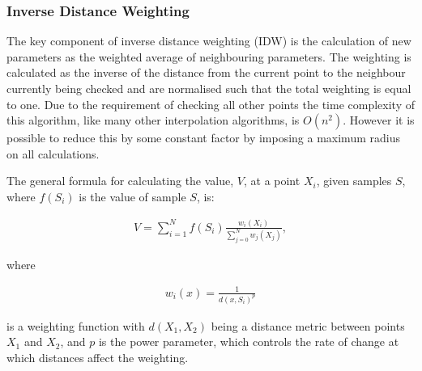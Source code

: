         \subsubsection{Inverse Distance Weighting}\label{background_interpolation_methods_inverse_distance_weighting}

            The key component of inverse distance weighting (IDW) is the calculation of new parameters as the weighted average of neighbouring parameters. The weighting is calculated as the inverse of the distance from the current point to the neighbour currently being checked and are normalised such that the total weighting is equal to one. Due to the requirement of checking all other points the time complexity of this algorithm, like many other interpolation algorithms, is $O(n^{2})$. However it is possible to reduce this by some constant factor by imposing a maximum radius on all calculations. 

            The general formula for calculating the value, $V$, at a point $X_{i}$, given samples $S$, where $f(S_{i})$ is the value of sample $S$, is:

            \begin{align*}
                V = \sum_{i=1}^{N}{f(S_{i})\frac{w_{i}(X_{i})}{\sum_{j=0}^{N}{w_{j}(X_{j})}}},
            \end{align*}

            where 

            \begin{align*}
                w_{i}(x) = \frac{1}{d(x,S_{i})^{p}}
            \end{align*}

            is a weighting function with $d(X_{1},X_{2})$ being a distance metric between points $X_{1}$ and $X_{2}$, and $p$ is the power parameter, which controls the rate of change at which distances affect the weighting.

